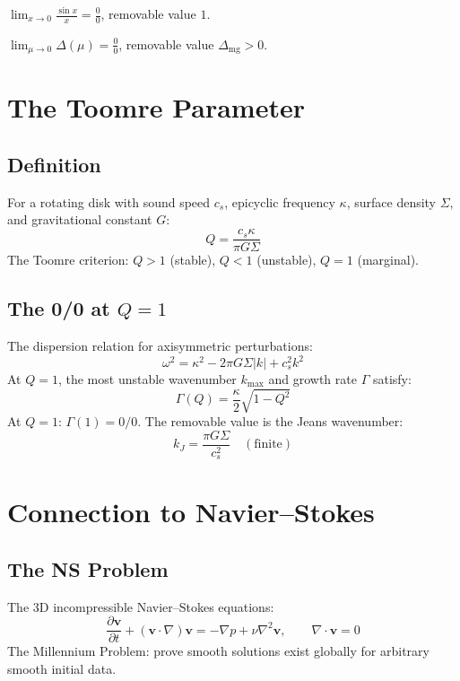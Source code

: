 \documentclass[11pt]{article}
\newcommand{\massgap}{\Delta_{\text{mg}}}
\begin{document}
\begin{example}[L'H\^{o}pital]
$\displaystyle\lim_{x \to 0} \frac{\sin x}{x} = \frac{0}{0}$, removable
value $1$.
\end{example}

\begin{example}
$\displaystyle\lim_{\mu \to 0} \Delta(\mu) = \frac{0}{0}$, removable
value $\massgap > 0$.
\end{example}

\section{The Toomre Parameter}

\subsection{Definition}

For a rotating disk with sound speed $c_s$, epicyclic frequency
$\kappa$, surface density $\Sigma$, and gravitational constant $G$:
\[
  Q = \frac{c_s \kappa}{\pi G \Sigma}
\]
The Toomre criterion: $Q > 1$ (stable), $Q < 1$ (unstable),
$Q = 1$ (marginal).

\subsection{The 0/0 at $Q = 1$}

The dispersion relation for axisymmetric perturbations:
\[
  \omega^2 = \kappa^2 - 2\pi G\Sigma |k| + c_s^2 k^2
\]
At $Q = 1$, the most unstable wavenumber $k_{\max}$ and growth rate
$\Gamma$ satisfy:
\[
  \Gamma(Q) = \frac{\kappa}{2}\sqrt{1 - Q^2}
\]
At $Q = 1$: $\Gamma(1) = 0/0$.  The removable value is the Jeans
wavenumber:
\[
  k_J = \frac{\pi G \Sigma}{c_s^2} \quad (\text{finite})
\]

\section{Connection to Navier--Stokes}

\subsection{The NS Problem}

The 3D incompressible Navier--Stokes equations:
\[
  \frac{\partial \mathbf{v}}{\partial t} + (\mathbf{v}\cdot\nabla)\mathbf{v}
  = -\nabla p + \nu \nabla^2 \mathbf{v}, \qquad \nabla\cdot\mathbf{v} = 0
\]
The Millennium Problem: prove smooth solutions exist globally for
arbitrary smooth initial data.
\end{document}
